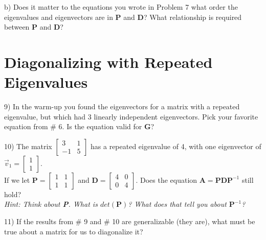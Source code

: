 \documentclass{article}
\begin{document}
\begin{flushleft}
\vspace{2.5in}

b) Does it matter to the equations you wrote in Problem 7 what order the eigenvalues and eigenvectors are in \textbf{P} and \textbf{D}? What relationship is required between \textbf{P} and \textbf{D}?

\vspace{1in}

\section*{Diagonalizing with Repeated Eigenvalues}
9) In the warm-up you found the eigenvectors for a matrix with a repeated eigenvalue, but which had 3 linearly independent eigenvectors. Pick your favorite equation from \# 6. Is the equation valid for \textbf{G}?

\vspace{2.5in}

10) The matrix $\begin{bmatrix} 3 & 1 \\ -1 & 5 \end{bmatrix}$ has a repeated eigenvalue of 4, with one eigenvector of $\vec{v}_1=\begin{bmatrix} 1 \\ 1 \end{bmatrix}$. \\
If we let $\textbf{P}=\begin{bmatrix} 1 & 1 \\ 1 & 1 \end{bmatrix}$ and $\textbf{D} = \begin{bmatrix} 4 & 0 \\ 0 & 4 \end{bmatrix}$. Does the equation $\textbf{A} = \textbf{PDP}^{-1}$ still hold? \\

\textit{Hint: Think about \textbf{P}. What is $det(\textbf{P})$? What does that tell you about $\textbf{P}^{-1}$? }

\vspace{2in}

11) If the results from \# 9 and \# 10 are generalizable (they are), what must be true about a matrix for us to diagonalize it?

\vspace{1in}

\end{flushleft}
\end{document}
